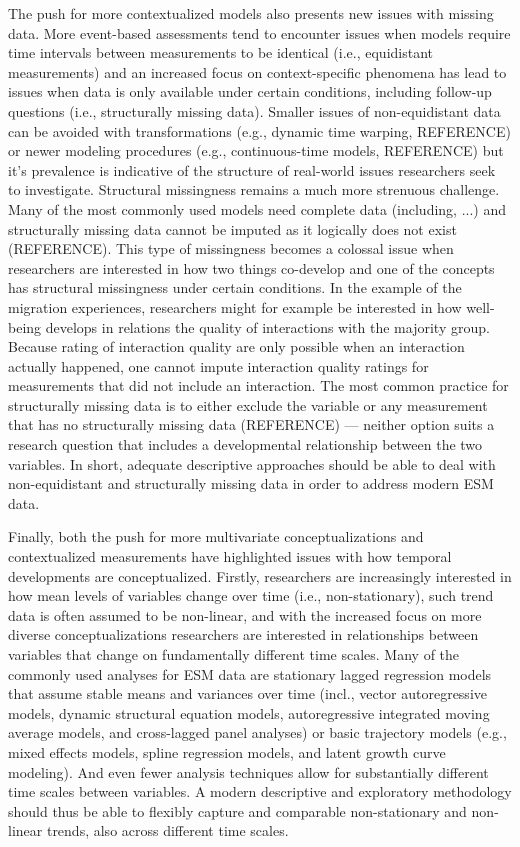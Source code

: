 \documentclass[man, 12pt, a4paper]{apa7}
\theoremstyle{break}
\theoremstyle{plain}
\begin{document}
The push for more contextualized models also presents new issues with missing data. More event-based assessments tend to encounter issues when models require time intervals between measurements to be identical (i.e., equidistant measurements) and an increased focus on context-specific phenomena has lead to issues when data is only available under certain conditions, including follow-up questions (i.e., structurally missing data). Smaller issues of non-equidistant data can be avoided with transformations (e.g., dynamic time warping, REFERENCE) or newer modeling procedures (e.g., continuous-time models, REFERENCE) but it's prevalence is indicative of the structure of real-world issues researchers seek to investigate. Structural missingness remains a much more strenuous challenge. Many of the most commonly used models need complete data (including, ...) and structurally missing data cannot be imputed as it logically does not exist (REFERENCE). This type of missingness becomes a colossal issue when researchers are interested in how two things co-develop and one of the concepts has structural missingness under certain conditions. In the example of the migration experiences, researchers might for example be interested in how well-being develops in relations the quality of interactions with the majority group. Because rating of interaction quality are only possible when an interaction actually happened, one cannot impute interaction quality ratings for measurements that did not include an interaction. The most common practice for structurally missing data is to either exclude the variable or any measurement that has no structurally missing data (REFERENCE) --- neither option suits a research question that includes a developmental relationship between the two variables. In short, adequate descriptive approaches should be able to deal with non-equidistant and structurally missing data in order to address modern ESM data.

Finally, both the push for more multivariate conceptualizations and contextualized measurements have highlighted issues with how temporal developments are conceptualized. Firstly, researchers are increasingly interested in how mean levels of variables change over time (i.e., non-stationary), such trend data is often assumed to be non-linear, and with the increased focus on more diverse conceptualizations researchers are interested in relationships between variables that change on fundamentally different time scales. Many of the commonly used analyses for ESM data are stationary lagged regression models that assume stable means and variances over time (incl., vector autoregressive models, dynamic structural equation models, autoregressive integrated moving average models, and cross-lagged panel analyses) or basic trajectory models (e.g., mixed effects models, spline regression models, and latent growth curve modeling). And even fewer analysis techniques allow for substantially different time scales between variables. A modern descriptive and exploratory methodology should thus be able to flexibly capture and comparable non-stationary and non-linear trends, also across different time scales.
\end{document}

